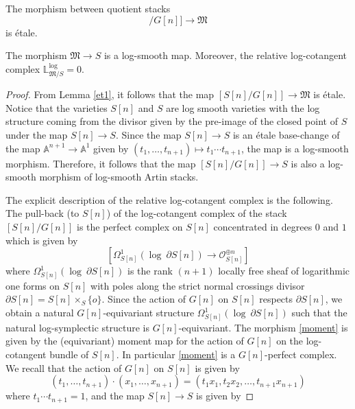 \documentclass[10pt,a4paper]{amsart}
\begin{document}
\begin{Lem}\label{et1}
The morphism between quotient stacks 
\begin{equation}
[S[n]/G[n]]\longrightarrow \mathfrak M
\end{equation}
is \'{e}tale.
\end{Lem}

\begin{Prop}\label{rellog101}
The morphism $\mathfrak M\longrightarrow S$ is a log-smooth map. Moreover, the relative log-cotangent complex $\mathbb L^{\log}_{\mathfrak M/S}=0$. 
\end{Prop}

\begin{proof}
From Lemma \ref{et1}, it follows that the map $[S[n]/ G[n]]\longrightarrow \mathfrak M$ is \'{e}tale. Notice that the varieties $S[n]$ and $S$ are log smooth varieties with the log structure coming from the divisor given by the pre-image of the closed point of $S$ under the map $S[n]\longrightarrow S$. Since the map $S[n]\longrightarrow S$ is an \'{e}tale base-change of the map $\mathbb A^{n+1}\longrightarrow \mathbb A^1$ given by $(t_1, \dots, t_{n+1})\mapsto t_1\cdots t_{n+1}$, the map is a log-smooth morphism. Therefore, it follows that the map $[S[n]/ G[n]]\longrightarrow S$ is also a log-smooth morphism of log-smooth Artin stacks. 

The explicit description of the relative log-cotangent complex is the following. 
The pull-back (to $S[n]$) of the log-cotangent complex of the stack $[S[n]/G[n]]$ is the perfect 
complex on $S[n]$ concentrated in degrees $0$ and $1$ which is given by 
\begin{equation}\label{moment}
\left[\Omega_{S[n]}^{1}(\log ~\partial S[n])\longrightarrow \mathcal O_{S[n]}^{\oplus n}\right]
\end{equation} 
where $\Omega_{S[n]}^{1}(\log ~\partial S[n])$ is the rank $(n+1)$ locally free sheaf of logarithmic one forms on $S[n]$ with poles along the strict normal crossings divisor $\partial S[n] = S[n]\times_{S} \{o\}$.  Since the action of $G[n]$ on $S[n]$ respects $\partial S[n]$, we obtain a natural $G[n]$-equivariant structure $\Omega_{S[n]}^{1}(\log ~\partial S[n])$  such that the natural log-symplectic structure is $G[n]$-equivariant. The morphism \eqref{moment} is given by the (equivariant)  moment map for the action of $G[n]$ on the log-cotangent bundle of $S[n]$. In particular \eqref{moment} is a $G[n]$-perfect complex. We recall that the action of $G[n]$ on $S[n]$ is given by 
\begin{equation}\label{act123}
(t_1, \dots, t_{n+1})\cdot(x_1, \dots, x_{n+1})=(t_1x_1, t_2 x_2, \dots, t_{n+1}x_{n+1})
\end{equation}
where $t_1\cdots t_{n+1}=1$, and the map $S[n]\longrightarrow S$ is given by


\end{proof}
\end{document}
